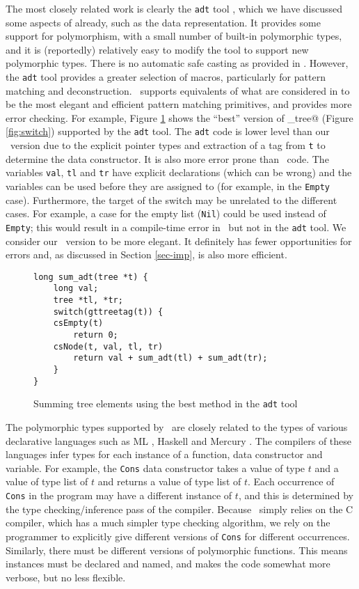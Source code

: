 The most closely related work is clearly the \texttt{adt} tool
\cite{adttool}, which we have discussed some aspects of already, such
as the data representation.  It provides some support for polymorphism,
with a small number of built-in polymorphic types, and it is (reportedly)
relatively easy to modify the tool to support new polymorphic types.
There is no automatic safe casting as provided in \adtpp.  However, the
\texttt{adt} tool provides a greater selection of macros, particularly
for pattern matching and deconstruction.  \Adtpp\ supports equivalents
of what are considered in \cite{adttool} to be the most elegant and
efficient pattern matching primitives, and provides more error checking.
For example, Figure \ref{fig:switch_adt} shows the ``best'' version of
\verb@sum_tree@ (Figure \ref{fig:switch}) supported by the \texttt{adt}
tool.  The \texttt{adt}
code is lower level than our \adtpp\ version due to the explicit
pointer types and extraction of a tag from \texttt{t} to determine the
data constructor.  It is also more error prone than \adtpp\ code.
The variables \texttt{val}, \texttt{tl} and \texttt{tr} have explicit
declarations (which can be wrong) and the variables can be used before they
are assigned to (for example, in the \texttt{Empty} case).  Furthermore,
the target of
the switch may be unrelated to the different cases.  For example, a case
for the empty list (\texttt{Nil}) could be used instead of \texttt{Empty};
this would result in a compile-time error in \adtpp\ but not in the
\texttt{adt} tool.
We consider our \adtpp\ version to be more elegant.
It definitely has
fewer opportunities for errors and, as discussed in Section \ref{sec-imp},
is also more efficient.

\begin{figure}[!ht]
\begin{verbatim}
long sum_adt(tree *t) {
    long val;
    tree *tl, *tr;
    switch(gttreetag(t)) {
    csEmpty(t)
        return 0;
    csNode(t, val, tl, tr)
        return val + sum_adt(tl) + sum_adt(tr);
    }
}
\end{verbatim}
\caption{Summing tree elements using the best method in the \texttt{adt}
tool}
\label{fig:switch_adt}
\end{figure}


The polymorphic types supported by \adtpp\ are closely related to the
types of various declarative languages such as ML \cite{ml}, Haskell
\cite{haskell} and Mercury \cite{mercury}.  The compilers of these
languages infer types for each instance of a function, data constructor
and variable.  For example, the \texttt{Cons} data constructor
takes a value of type $t$ and a value of type list of $t$ and returns
a value of type list of $t$.  Each occurrence of \texttt{Cons} in the
program may have a different instance of $t$, and this is determined
by the type checking/inference pass of the compiler.  Because \adtpp\
simply relies on the C compiler, which has a much simpler type checking
algorithm, we rely on the programmer to explicitly give different
versions of \texttt{Cons} for different occurrences.  Similarly,
there must be different versions of
polymorphic functions.  This means instances must be declared and named,
and makes the code somewhat more verbose, but no less flexible.

